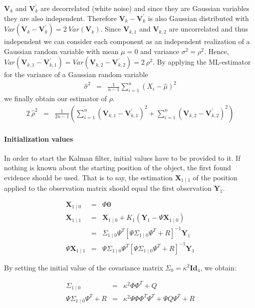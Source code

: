 \documentclass[a4paper, 12pt, titlepage]{article}
\begin{document}
$\pmb{V}_k$ and $\pmb{V}^{\prime}_k$ are decorrelated (white noise) and since they are Gaussian variables they are also independent.
Therefore $\pmb{V}_k - \pmb{V}_{k}^{\prime}$ is also Gaussian distributed with $Var(\pmb{V}_k - \pmb{V}_{k}^{\prime}) = 2\ Var(\pmb{V}_k)$.
Since $\pmb{V}_{k,1}$ and $\pmb{V}_{k,2}$ are uncorrelated and thus independent we can consider each component as an independent realization of a Gaussian random variable with mean $\mu=0$ and variance $\sigma^2=\rho^2$.
Hence, $Var(\pmb{V}_{k,1} - \pmb{V}_{k,1}^{\prime}) = Var(\pmb{V}_{k,2} - \pmb{V}_{k,2}^{\prime}) =2\ \rho^2$.
By applying the ML-estimator for the variance of a Gaussian random variable
\begin{eqnarray}
	\hat{\sigma}^2 &=& \frac{1}{n-1}\sum_{i=1}^{n}(X_{i}-\hat{\mu})^2
\end{eqnarray}
we finally obtain our estimator of $\rho$.
\begin{eqnarray}
	2\ \hat{\rho}^2 &=& \frac{1}{2n-1}\left(\sum_{i=1}^{n}(\pmb{V}_{k,1} - \pmb{V}_{k,1}^{\prime})^2 + \sum_{i=1}^{n}(\pmb{V}_{k,2} - \pmb{V}_{k,2}^{\prime})^2 \right)
\end{eqnarray}


\paragraph{Initialization values}

In order to start the Kalman filter, initial values have to be provided to it.
If nothing is known about the starting position of the object, the first found evidence should be used.
That is to say, the estimation $\pmb{X}_{1\mid 1}$ of the position applied to the observation matrix should equal the first observation $\pmb{Y}_1$.

\begin{eqnarray}
	\pmb{X}_{1\mid 0} &=& \Phi \pmb{0} \\
	\pmb{X}_{1\mid 1} &=& \pmb{X}_{1\mid 0} + K_1(\pmb{Y}_1 -\Psi \pmb{X}_{1\mid 0})\\
	&=& \Sigma_{1\mid 0} \Psi^T \left[ \Psi\Sigma_{1\mid 0} \Psi^T +R \right]^{-1}\pmb{Y}_1\\
	\Psi\pmb{X}_{1\mid 1} &=& \Psi \Sigma_{1\mid 0} \Psi^T \left[ \Psi\Sigma_{1\mid 0} \Psi^T +R \right]^{-1}\pmb{Y}_1
\end{eqnarray}

By setting the initial value of the covariance matrix $\Sigma_0=\kappa^2 \pmb{Id}_4$, we obtain:

\begin{eqnarray}
	\Sigma_{1\mid 0} &=& \kappa^2\Phi \Phi^T + Q\\
	\Psi \Sigma_{1\mid 0} \Psi^T + R &=& \kappa^2 \Psi \Phi \Phi^T \Psi^T + \Psi Q \Psi^T + R
\end{eqnarray}
\end{document}
